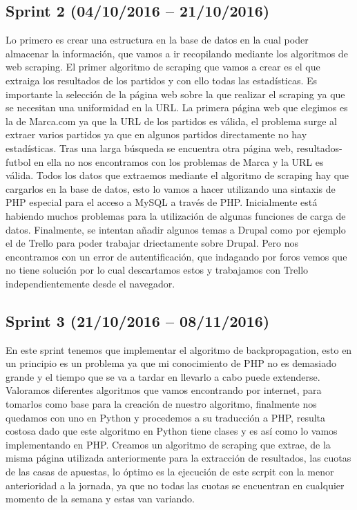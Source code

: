 \subsection{Sprint 2 (04/10/2016 – 21/10/2016)}
Lo primero es crear una estructura en la base de datos en la cual poder almacenar la información, que vamos a ir recopilando mediante los algoritmos de web scraping.
El primer algoritmo de scraping que vamos a crear es el que extraiga los resultados de los partidos y con ello todas las estadísticas. Es importante la selección de la página web sobre la que realizar el scraping ya que se necesitan una uniformidad en la URL. La primera página web que elegimos es la de Marca.com ya que la URL de los partidos es válida, el problema surge al extraer varios partidos ya que en algunos partidos directamente no hay estadísticas. Tras una larga búsqueda se encuentra otra página web, resultados-futbol en ella no nos encontramos con los problemas de Marca y la URL es válida.
Todos los datos que extraemos mediante el algoritmo de scraping hay que cargarlos en la base de datos, esto lo vamos a hacer utilizando una sintaxis de PHP especial para el acceso a MySQL a través de PHP. Inicialmente está habiendo muchos problemas para la utilización de algunas funciones de carga de datos.
Finalmente, se intentan añadir algunos temas a Drupal como por ejemplo el de Trello para poder trabajar driectamente sobre Drupal. Pero nos encontramos con un error de autentificación, que indagando por foros vemos que no tiene solución por lo cual descartamos estos y trabajamos con Trello independientemente desde el navegador.

\subsection{Sprint 3 (21/10/2016 – 08/11/2016)}
En este sprint tenemos que implementar el algoritmo de backpropagation, esto en un principio es un problema ya que mi conocimiento de PHP no es demasiado grande y el tiempo que se va a tardar en llevarlo a cabo puede extenderse. Valoramos diferentes algoritmos que vamos encontrando por internet, para tomarlos como base para la creación de nuestro algoritmo, finalmente nos quedamos con uno en Python y procedemos a su traducción a PHP, resulta costosa dado que este algoritmo en Python tiene clases y es así como lo vamos implementando  en PHP.
Creamos un algoritmo de scraping que extrae, de la misma página utilizada anteriormente para la extracción de resultados, las cuotas de las casas de apuestas, lo óptimo es la ejecución de este scrpit con la menor anterioridad a la jornada, ya que no todas las cuotas se encuentran en cualquier momento de la semana y estas van variando.

